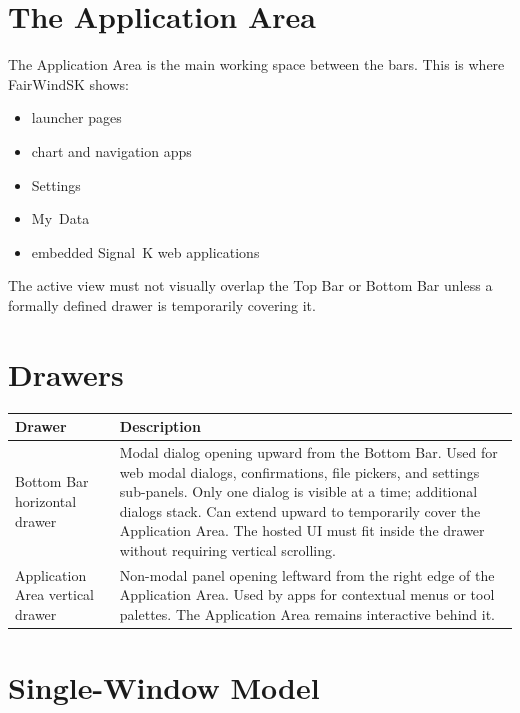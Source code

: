 
\section{The Application Area}

The Application Area is the main working space between the bars.
This is where FairWindSK shows:

\begin{itemize}
  \item launcher pages
  \item chart and navigation apps
  \item Settings
  \item My~Data
  \item embedded Signal~K web applications
\end{itemize}

The active view must not visually overlap the Top Bar or Bottom Bar unless a
formally defined drawer is temporarily covering it.

\section{Drawers}

\begin{longtable}{L{4.0cm}L{9.7cm}}
\toprule
{}
\color{white}\sffamily\bfseries Drawer &
\color{white}\sffamily\bfseries Description \\
\midrule
Bottom Bar horizontal drawer &
  Modal dialog opening upward from the Bottom Bar.
  Used for web modal dialogs, confirmations, file pickers, and settings sub-panels.
  Only one dialog is visible at a time; additional dialogs stack.
  Can extend upward to temporarily cover the Application Area.
  The hosted UI must fit inside the drawer without requiring vertical scrolling. \\
Application Area vertical drawer &
  Non-modal panel opening leftward from the right edge of the Application Area.
  Used by apps for contextual menus or tool palettes.
  The Application Area remains interactive behind it. \\
\bottomrule
\end{longtable}

\section{Single-Window Model}

